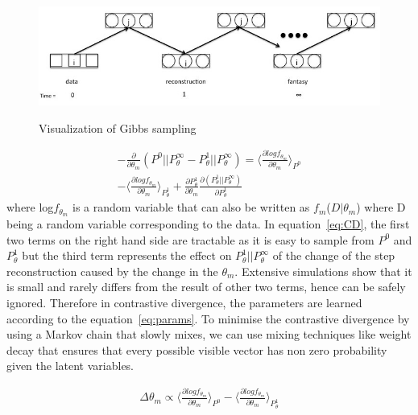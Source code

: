 \documentclass[conference]{IEEEtran}
\begin{document}
 \begin{figure}[t]
\centering
\includegraphics[width=12cm,height=4cm]{gibbs.jpg}
\caption{Visualization of Gibbs sampling}
\label{fig:gibbs}
\end{figure}

\begin{eqnarray}
- \frac {\partial} {\partial\theta_{m}} (P^0 || P^\infty_\theta - P^1_\theta || P^\infty_\theta) = \langle \frac {\partial log f_{\theta_{m}}}{\partial \theta_m} \rangle_{P^0} \\
- \langle \frac {\partial log f_{\theta_{m}}}{\partial \theta_m} \rangle_{P^1_\theta} + \nonumber \frac{\partial{P^1_\theta}}{\partial\theta_m} \frac{\partial(P^1_\theta || P^\infty_\theta)}{\partial{P^1_\theta}}
 \label{eq:CD}
\end{eqnarray}
where log$f_{\theta_{m}}$ is a random variable that can also be written as $f_m$($D|\theta_m$) where D being a random variable corresponding to the data.
In equation~\ref{eq:CD}, the first two terms on the right hand side are tractable as it is easy to sample from $P^0$ and $P^1_\theta$ but the third term represents the effect on $P^1_\theta || P^\infty_\theta$ of the change of the step reconstruction caused by the change in the $\theta_m$. Extensive simulations show that it is small and rarely differs from the result of other two terms, hence can be safely ignored. Therefore in contrastive divergence, the parameters are learned according to the equation~\ref{eq:params}. To minimise the contrastive divergence by using a Markov chain that slowly mixes, we can use mixing techniques like weight decay that ensures that every possible visible vector has non zero probability given the latent variables.

\begin{eqnarray}
\Delta\theta_m \propto \langle \frac {\partial log f_{\theta_{m}}}{\partial \theta_m}\rangle_{P^0} - \langle \frac {\partial log f_{\theta_{m}}}{\partial \theta_m} \rangle_{P^1_\theta} \label{eq:params}
\end{eqnarray}
\end{document}
